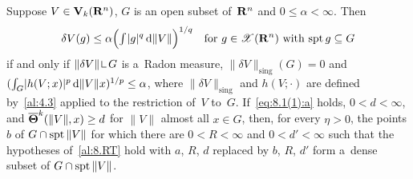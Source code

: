 \begin{remark}
    \label{al:8.1(1)}
    Suppose $V \in \mathbf{V}_{k}(\mathbf{R}^{n})$, $G$ is an open subset of~$\mathbf{R}^{n}$ and $0 \le \alpha <
    \infty$. Then
    \begin{equation}
        \label{eq:8.1(1):a}
        \delta V(g) \le \alpha \Big( {\textstyle\int_{}^{}} |g|^q \,\mathrm{d} \|V\| \Big)^{1/q} \quad \text{for $g \in
        \mathscr{X}(\mathbf{R}^{n})$ with $\operatorname{spt} g \subseteq G$}
    \end{equation}
    if and only if $\|\delta V\| \restrict G$ is a~Radon measure, $\|\delta V\|_{\mathrm{sing}}(G) =
    0$ and $({\textstyle\int_{G}^{}} |h(V;x)|^p \,\mathrm{d} \|V\| x)^{1/p} \le \alpha$, where $\|\delta
    V\|_{\mathrm{sing}}$ and $h(V;\cdot)$ are defined by~\ref{al:4.3} applied to the restriction
    of~$V$ to~$G$. If~\eqref{eq:8.1(1):a} holds, $0 < d < \infty$, and $\boldsymbol{\overline{\Theta}}^{k}(\|V\|,x)
    \ge d$ for $\|V\|$ almost all $x \in G$, then, for every $\eta > 0$, the points $b$ of $G \cap
    \operatorname{spt} \|V\|$ for which there are $0 < R < \infty$ and $0 < d' < \infty$ such that the hypotheses
    of~\ref{al:8.RT} hold with $a$, $R$, $d$ replaced by $b$, $R$, $d'$ form a~dense subset of $G
    \cap \operatorname{spt} \|V\|$.
\end{remark}

